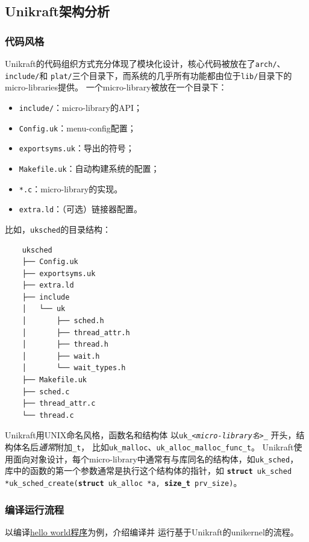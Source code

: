 \documentclass{../runikraft-report}
\begin{document}
\subsection{Unikraft架构分析}\vspace*{-4ex}
\subsubsection{代码风格}\label{ssubsec:code-style}
Unikraft的代码组织方式充分体现了模块化设计，核心代码被放在了\texttt{arch/}、\texttt{include/}和
\texttt{plat/}三个目录下，而系统的几乎所有功能都由位于\texttt{lib/}目录下的micro-libraries提供。
一个micro-library被放在一个目录下：
\begin{itemize}
\item \texttt{include/}：micro-library的API；
\item \texttt{Config.uk}：menu-config配置；
\item \texttt{exportsyms.uk}：导出的符号；
\item \texttt{Makefile.uk}：自动构建系统的配置；
\item \texttt{*.c}：micro-library的实现。
\item \texttt{extra.ld}：（可选）链接器配置。
\end{itemize}

比如，\texttt{uksched}的目录结构：
{\linespread{1}
\begin{verbatim}
    uksched
    ├── Config.uk
    ├── exportsyms.uk
    ├── extra.ld
    ├── include
    │   └── uk
    │       ├── sched.h
    │       ├── thread_attr.h
    │       ├── thread.h
    │       ├── wait.h
    │       └── wait_types.h
    ├── Makefile.uk
    ├── sched.c
    ├── thread_attr.c
    └── thread.c
\end{verbatim}}

Unikraft用UNIX命名风格，函数名和结构体
以\texttt{uk\_\hspace{0cm}\textit{<micro-library\hspace{0cm}名\hspace{0cm}>}\hspace{0cm}\_}
开头，结构体名后\textit{通常}附加\texttt{\_t}，
比如\texttt{uk\_malloc}、\texttt{uk\_alloc\_malloc\_func\_t}。
Unikraft使用面向对象设计，每个micro-library中通常有与库同名的结构体，如\texttt{uk\_sched}，
库中的函数的第一个参数通常是执行这个结构体的指针，如
\texttt{\textbf{struct} uk\_sched *uk\_sched\_create(\textbf{struct} uk\_alloc *a, \textbf{size\_t} prv\_size)}。

\subsubsection{编译运行流程}
以编译\href{https://github.com/unikraft/app-helloworld}{hello world程序}为例，介绍编译并
运行基于Unikraft的unikernel的流程。
\end{document}
